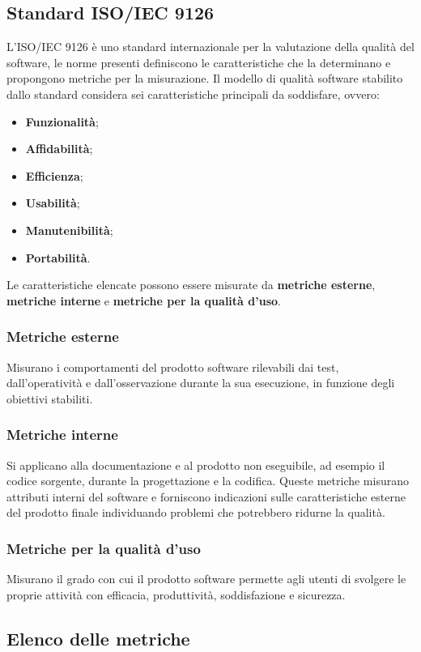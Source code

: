 \subsection{Standard ISO/IEC 9126}\label{9126}
L'ISO/IEC 9126 è uno standard internazionale per la valutazione della qualità del software, le norme presenti definiscono le caratteristiche che la determinano e propongono metriche per la misurazione.
Il modello di qualità software stabilito dallo standard considera sei caratteristiche principali da soddisfare, ovvero:
\begin{itemize}
	\item \textbf{Funzionalità};
	\item \textbf{Affidabilità};
	\item \textbf{Efficienza};
	\item \textbf{Usabilità};
	\item \textbf{Manutenibilità};
	\item \textbf{Portabilità}.
\end{itemize}
Le caratteristiche elencate possono essere misurate da \textbf{metriche esterne}, \textbf{metriche interne} e \textbf{metriche per la qualità d'uso}.
\subsubsection*{Metriche esterne}%
Misurano i comportamenti del prodotto software rilevabili dai test, dall'operatività e dall'osservazione durante la sua esecuzione, in funzione degli obiettivi stabiliti.
\subsubsection*{Metriche interne}
Si applicano alla documentazione e al prodotto non eseguibile, ad esempio il codice sorgente, durante la progettazione e la codifica. Queste metriche misurano attributi interni del software e forniscono indicazioni sulle caratteristiche esterne del prodotto finale individuando problemi che potrebbero ridurne la qualità.
\subsubsection*{Metriche per la qualità d'uso}
Misurano il grado con cui il prodotto software permette agli utenti di svolgere le proprie attività con efficacia, produttività, soddisfazione e sicurezza.

\subsection{Elenco delle metriche} \label{Metriche}
